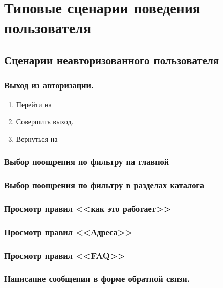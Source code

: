\chapter{Типовые сценарии поведения пользователя}

    \section{Сценарии неавторизованного пользователя}

        \subsection{Выход из авторизации.}
        \label{sec:usecase_exit}
            \begin{enumerate}
                \item Перейти на  
                \item Совершить выход.
                \item Вернуться на 
            \end{enumerate}

    
        \subsection{Выбор поощрения по фильтру на главной}
        
        
        \subsection{Выбор поощрения по фильтру в разделах каталога}
        
        \subsection{Просмотр правил <<как это работает>>}
        
        \subsection{Просмотр правил <<Адреса>>}
        
        \subsection{Просмотр правил <<FAQ>>}
        
        \subsection{Написание сообщения в форме обратной связи.}

